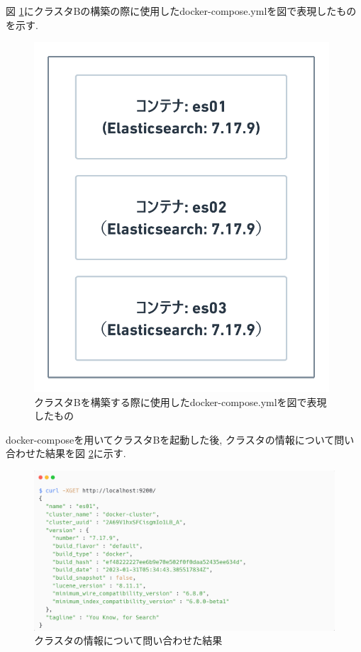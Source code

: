図 \ref{4-p10}にクラスタBの構築の際に使用したdocker-compose.ymlを図で表現したものを示す.

\begin{figure}[H]
  \begin{center}
    \includegraphics[width=110mm]{sotu/figure/all-7.19.9.png}
    \caption{クラスタBを構築する際に使用したdocker-compose.ymlを図で表現したもの}
    \label{4-p10}
  \end{center}
\end{figure}

docker-composeを用いてクラスタBを起動した後, クラスタの情報について問い合わせた結果を図 \ref{4-p11}に示す.

\begin{figure}[H]
  \begin{center}
    \includegraphics[width=140mm]{sotu/figure/3nodes-cluster.png}
    \caption{クラスタの情報について問い合わせた結果}
    \label{4-p11}
  \end{center}
\end{figure}


